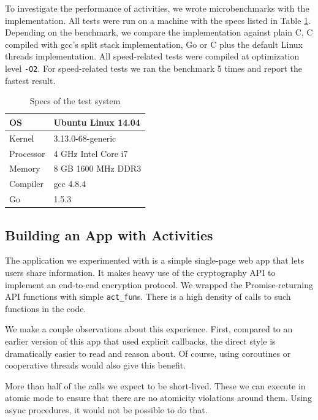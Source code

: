\documentclass[preprint, 10pt, numbers]{sigplanconf}
\begin{document}
To investigate the performance of activities, we wrote microbenchmarks with the \charcoal{} implementation.
All tests were run on a machine with the specs listed in Table \ref{table:specs}.
Depending on the benchmark, we compare the \charcoal{} implementation against plain C, C compiled with gcc's split stack implementation, Go or C plus the default Linux threads implementation.
All speed-related tests were compiled at optimization level \texttt{-O2}.
For speed-related tests we ran the benchmark 5 times and report the fastest result.

\begin{table}
  \centering
  \begin{tabular}{|l|l|}
    \hline
    OS & Ubuntu Linux 14.04 \\
    \hline
    Kernel & 3.13.0-68-generic \\
    \hline
    Processor & 4 GHz Intel Core i7 \\
    \hline
    Memory & 8 GB 1600 MHz DDR3 \\
    \hline
    Compiler & gcc 4.8.4 \\
    \hline
    Go & 1.5.3 \\
    \hline
  \end{tabular}
  \caption{Specs of the test system}
  \label{table:specs}
\end{table}

\subsection{Building an App with Activities}

The application we experimented with is a simple single-page web app that lets users share information.
It makes heavy use of the cryptography API to implement an end-to-end encryption protocol.
We wrapped the Promise-returning API functions with simple \texttt{act\_fun}s.
There is a high density of calls to such functions in the code.

We make a couple observations about this experience.
First, compared to an earlier version of this app that used explicit callbacks, the direct style is dramatically easier to read and reason about.
Of course, using coroutines or cooperative threads would also give this benefit.

More than half of the calls we expect to be short-lived.
These we can execute in atomic mode to ensure that there are no atomicity violations around them.
Using async procedures, it would not be possible to do that.
\end{document}
